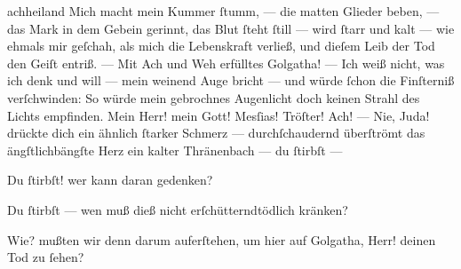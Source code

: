\documentclass{ees}
\begin{document}
{\begin{movement}{achheiland}
    \voice[Lazarus]
    Mich macht mein Kummer ſtumm, — die matten Glieder beben, —
    das Mark in dem Gebein gerinnt, das Blut ſteht ſtill —
    wird ſtarr und kalt — wie ehmals mir geſchah,
    als mich die Lebenskraft verließ,
    und dieſem Leib der Tod den Geiſt entriß. —
    Mit Ach und Weh erfülltes Golgatha! —
    Ich weiß nicht, was ich denk und will —
    mein weinend Auge bricht —
    und würde ſchon die Finſterniß verſchwinden:
    So würde mein gebrochnes Augenlicht
    doch keinen Strahl des Lichts empfinden.
    Mein Herr! mein Gott! Mesſias! Tröſter! Ach! —
    Nie, Juda! drückte dich ein ähnlich ſtarker Schmerz —
    durchſchaudernd überſtrömt das ängſtlichbängſte Herz
    ein kalter Thränenbach —
    du ſtirbſt —

    \voice[Eidli]
    \hspace*{3cm}Du ſtirbſt! wer kann daran gedenken?

    \voice[Lazarus]
    Du ſtirbſt — wen muß dieß nicht erſchütterndtödlich kränken?

    Wie? mußten wir denn darum auferſtehen,
    um hier auf Golgatha, Herr! deinen Tod zu ſehen?
  \end{movement}




}

\eesScore
\end{document}
